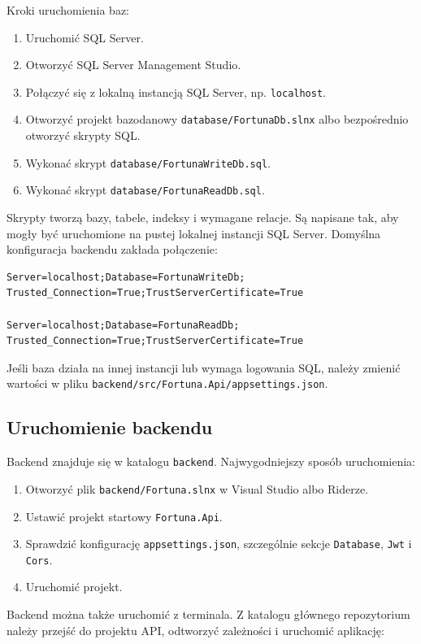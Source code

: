 \documentclass[12pt,a4paper]{article}
\begin{document}
Kroki uruchomienia baz:
\begin{enumerate}[nosep]
    \item Uruchomić SQL Server.
    \item Otworzyć SQL Server Management Studio.
    \item Połączyć się z lokalną instancją SQL Server, np. \texttt{localhost}.
    \item Otworzyć projekt bazodanowy \texttt{database/FortunaDb.slnx} albo bezpośrednio otworzyć skrypty SQL.
    \item Wykonać skrypt \texttt{database/FortunaWriteDb.sql}.
    \item Wykonać skrypt \texttt{database/FortunaReadDb.sql}.
\end{enumerate}

Skrypty tworzą bazy, tabele, indeksy i wymagane relacje. Są napisane tak, aby mogły być uruchomione na pustej lokalnej instancji SQL Server. Domyślna konfiguracja backendu zakłada połączenie:

\begin{verbatim}
Server=localhost;Database=FortunaWriteDb;
Trusted_Connection=True;TrustServerCertificate=True

Server=localhost;Database=FortunaReadDb;
Trusted_Connection=True;TrustServerCertificate=True
\end{verbatim}

Jeśli baza działa na innej instancji lub wymaga logowania SQL, należy zmienić wartości w pliku \texttt{backend/src/Fortuna.Api/appsettings.json}.

\subsection{Uruchomienie backendu}

Backend znajduje się w katalogu \texttt{backend}. Najwygodniejszy sposób uruchomienia:
\begin{enumerate}[nosep]
    \item Otworzyć plik \texttt{backend/Fortuna.slnx} w Visual Studio albo Riderze.
    \item Ustawić projekt startowy \texttt{Fortuna.Api}.
    \item Sprawdzić konfigurację \texttt{appsettings.json}, szczególnie sekcje \texttt{Database}, \texttt{Jwt} i \texttt{Cors}.
    \item Uruchomić projekt.
\end{enumerate}

Backend można także uruchomić z terminala. Z katalogu głównego repozytorium należy przejść do projektu API, odtworzyć zależności i uruchomić aplikację:
\end{document}
